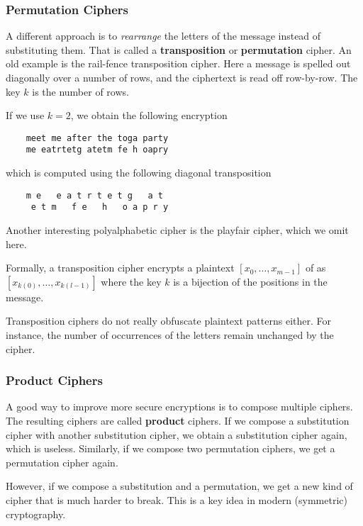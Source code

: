 \subsubsection{Permutation Ciphers}

A different approach is to \emph{rearrange} the letters of the message instead of substituting them.
That is called a \textbf{transposition} or \textbf{permutation} cipher.
An old example is the rail-fence transposition cipher.
Here a message is spelled out diagonally over a number of rows, and the ciphertext is read off row-by-row.
The key $k$ is the number of rows.

\begin{example}
 If we use $k=2$, we obtain the following encryption
  \begin{lstlisting}
    meet me after the toga party
    me eatrtetg atetm fe h oapry
  \end{lstlisting}
which is computed using the following diagonal transposition
  \begin{lstlisting}
    m e   e a t r t e t g   a t
     e t m   f e   h   o a p r y
  \end{lstlisting}
\end{example}
Another interesting polyalphabetic cipher is the playfair cipher, which we omit here.

Formally, a transposition cipher encrypts a plaintext $[x_0,\ldots,x_{m-1}]$ of as $[x_{k(0)},\ldots,x_{k(l-1)}]$ where the key $k$ is a bijection of the positions in the message.

Transposition ciphers do not really obfuscate plaintext patterns either.
For instance, the number of occurrences of the letters remain unchanged by the cipher.

\subsubsection{Product Ciphers}
 
A good way to improve more secure encryptions is to compose multiple ciphers.
The resulting ciphers are called \textbf{product} ciphers.
If we compose a substitution cipher with another substitution cipher, we obtain a substitution cipher again, which is useless.
Similarly, if we compose two permutation ciphers, we get a permutation cipher again.

However, if we compose a substitution and a permutation, we get a new kind of cipher that is much harder to break.
This is a key idea in modern (symmetric) cryptography. 

